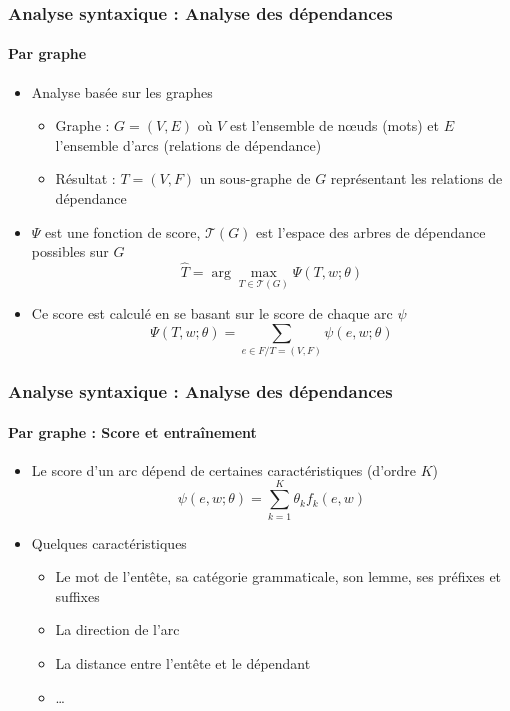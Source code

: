 \documentclass[xcolor=table]{beamer}
\begin{document}
\begin{frame}
\frametitle{Analyse syntaxique : Analyse des dépendances}
\framesubtitle{Par graphe}

\begin{minipage}{.6\textwidth}
	\begin{itemize}
		\item Analyse basée sur les graphes
		\begin{itemize}
			\item Graphe : $G = (V, E)$ où $V$ est l'ensemble de nœuds (mots) et $E$ l'ensemble d'arcs (relations de dépendance)
			\item Résultat : $T = (V, F)$ un sous-graphe de $G$ représentant les relations de dépendance
		\end{itemize}
	\end{itemize}
\end{minipage}
\begin{minipage}{.38\textwidth}
\end{minipage}

\begin{itemize}
	\item $\Psi$ est une fonction de score, $ \mathcal{T}(G) $ est l'espace des arbres de dépendance possibles sur $G$
	\[ \hat{T} = \arg\max\limits_{T \in \mathcal{T}(G)} \Psi(T, w; \theta) \]
	\item Ce score est calculé en se basant sur le score de chaque arc $\psi$
	\[ \Psi(T, w; \theta) = \sum_{e \in F / T = (V, F)} \psi(e, w; \theta) \]
\end{itemize}

\end{frame}

\begin{frame}
\frametitle{Analyse syntaxique : Analyse des dépendances}
\framesubtitle{Par graphe : Score et entraînement}

\begin{itemize}
	\item Le score d'un arc dépend de certaines caractéristiques (d'ordre $K$)
	\[ \psi(e, w; \theta) = \sum_{k = 1}^{K} \theta_k f_k(e, w)  \]
	
	\item Quelques caractéristiques 
	\begin{itemize}
		\item Le mot de l'entête, sa catégorie grammaticale, son lemme, ses préfixes et suffixes
		\item La direction de l'arc
		\item La distance entre l'entête et le dépendant
		\item \ldots
	\end{itemize}
	
\end{itemize}

\end{frame}
\end{document}
